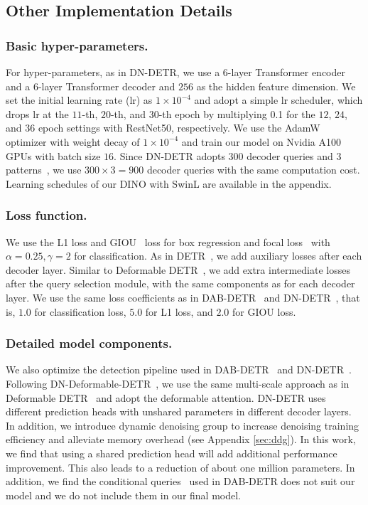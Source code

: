 \documentclass[runningheads]{llncs}
\begin{document}
\subsection{Other Implementation Details}\label{sec:imp_details}

\subsubsection{Basic hyper-parameters.}
For hyper-parameters, as in DN-DETR, we use a $6$-layer Transformer encoder and a $6$-layer Transformer decoder and $256$ as the hidden feature dimension. We set the initial learning rate (lr) as $1\times 10^{-4}$ and adopt a simple lr scheduler, which drops lr at the $11$-th, $20$-th, and $30$-th epoch by multiplying 0.1 for the $12$, $24$, and $36$ epoch settings with RestNet50, respectively. We use the AdamW~\cite{kingma2014adam,loshchilov2017decoupled} optimizer with weight decay of $1\times 10^{-4}$ and train our model on Nvidia A100 GPUs with batch size $16$. Since DN-DETR \cite{li2022dn} adopts $300$ decoder queries and $3$ patterns~\cite{wang2021anchor}, we use $300\times 3=900$ decoder queries with the same computation cost. Learning schedules of our DINO with SwinL are available in the appendix.

\subsubsection{Loss function.}
We use the L1 loss and GIOU~\cite{rezatofighi2019generalized} loss for box regression and focal loss~\cite{lin2018focal} with $\alpha=0.25,\gamma=2$ for classification. As in DETR~\cite{carion2020end}, we add auxiliary losses after each decoder layer. Similar to Deformable DETR~\cite{zhu2020deformable}, we add extra intermediate losses after the query selection module, with the same components as for each decoder layer. We use the same loss coefficients as in DAB-DETR~\cite{liu2022dab} and DN-DETR~\cite{li2022dn}, that is, $1.0$ for classification loss, $5.0$ for L1 loss, and $2.0$ for GIOU loss.

\subsubsection{Detailed model components.}
We also optimize the detection pipeline used in DAB-DETR~\cite{liu2022dab} and DN-DETR~\cite{li2022dn}. Following DN-Deformable-DETR~\cite{li2022dn}, we use the same multi-scale approach as in Deformable DETR~\cite{zhu2020deformable} and adopt the deformable attention. DN-DETR uses different prediction heads with unshared parameters in different decoder layers. In addition, we introduce dynamic denoising group to increase denoising training efficiency and alleviate memory overhead (see Appendix \ref{sec:ddg}). In this work, we find that using a shared prediction head will add additional performance improvement. This also leads to a reduction of about one million parameters. In addition, we find the conditional queries~\cite{meng2021conditional} used in DAB-DETR does not suit our model and we do not include them in our final model. 
\end{document}
